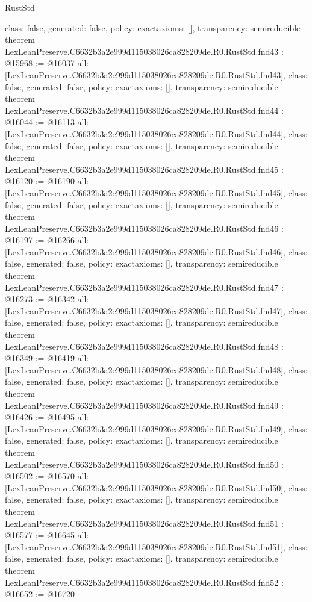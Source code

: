 \begin{lexlean}{RustStd}
\begin{coremodule}
{  class: false,
  generated: false,
  policy: exact{axioms: []},
  transparency: semireducible
}
theorem LexLeanPreserve.C6632b3a2e999d115038026ca828209de.R0.RustStd.fnd43 : @15968 := @16037 {
  all: [LexLeanPreserve.C6632b3a2e999d115038026ca828209de.R0.RustStd.fnd43],
  class: false,
  generated: false,
  policy: exact{axioms: []},
  transparency: semireducible
}
theorem LexLeanPreserve.C6632b3a2e999d115038026ca828209de.R0.RustStd.fnd44 : @16044 := @16113 {
  all: [LexLeanPreserve.C6632b3a2e999d115038026ca828209de.R0.RustStd.fnd44],
  class: false,
  generated: false,
  policy: exact{axioms: []},
  transparency: semireducible
}
theorem LexLeanPreserve.C6632b3a2e999d115038026ca828209de.R0.RustStd.fnd45 : @16120 := @16190 {
  all: [LexLeanPreserve.C6632b3a2e999d115038026ca828209de.R0.RustStd.fnd45],
  class: false,
  generated: false,
  policy: exact{axioms: []},
  transparency: semireducible
}
theorem LexLeanPreserve.C6632b3a2e999d115038026ca828209de.R0.RustStd.fnd46 : @16197 := @16266 {
  all: [LexLeanPreserve.C6632b3a2e999d115038026ca828209de.R0.RustStd.fnd46],
  class: false,
  generated: false,
  policy: exact{axioms: []},
  transparency: semireducible
}
theorem LexLeanPreserve.C6632b3a2e999d115038026ca828209de.R0.RustStd.fnd47 : @16273 := @16342 {
  all: [LexLeanPreserve.C6632b3a2e999d115038026ca828209de.R0.RustStd.fnd47],
  class: false,
  generated: false,
  policy: exact{axioms: []},
  transparency: semireducible
}
theorem LexLeanPreserve.C6632b3a2e999d115038026ca828209de.R0.RustStd.fnd48 : @16349 := @16419 {
  all: [LexLeanPreserve.C6632b3a2e999d115038026ca828209de.R0.RustStd.fnd48],
  class: false,
  generated: false,
  policy: exact{axioms: []},
  transparency: semireducible
}
theorem LexLeanPreserve.C6632b3a2e999d115038026ca828209de.R0.RustStd.fnd49 : @16426 := @16495 {
  all: [LexLeanPreserve.C6632b3a2e999d115038026ca828209de.R0.RustStd.fnd49],
  class: false,
  generated: false,
  policy: exact{axioms: []},
  transparency: semireducible
}
theorem LexLeanPreserve.C6632b3a2e999d115038026ca828209de.R0.RustStd.fnd50 : @16502 := @16570 {
  all: [LexLeanPreserve.C6632b3a2e999d115038026ca828209de.R0.RustStd.fnd50],
  class: false,
  generated: false,
  policy: exact{axioms: []},
  transparency: semireducible
}
theorem LexLeanPreserve.C6632b3a2e999d115038026ca828209de.R0.RustStd.fnd51 : @16577 := @16645 {
  all: [LexLeanPreserve.C6632b3a2e999d115038026ca828209de.R0.RustStd.fnd51],
  class: false,
  generated: false,
  policy: exact{axioms: []},
  transparency: semireducible
}
theorem LexLeanPreserve.C6632b3a2e999d115038026ca828209de.R0.RustStd.fnd52 : @16652 := @16720 {
}
\end{coremodule}
\end{lexlean}
